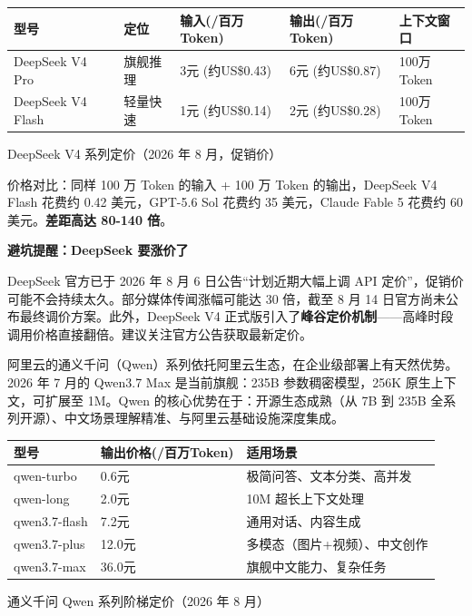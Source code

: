 \begin{center}
\begin{tabularx}{\linewidth}{|X|X|X|X|X|}
\hline
\textbf{型号} & \textbf{定位} & \textbf{输入(/百万Token)} & \textbf{输出(/百万Token)} & \textbf{上下文窗口} \tabularnewline
\hline
DeepSeek V4 Pro & 旗舰推理 & 3元 (约US\$0.43) & 6元 (约US\$0.87) & 100万Token \tabularnewline
DeepSeek V4 Flash & 轻量快速 & 1元 (约US\$0.14) & 2元 (约US\$0.28) & 100万Token \tabularnewline
\hline
\end{tabularx}
\end{center}

\begin{center}\small\color{gray}DeepSeek V4 系列定价（2026 年 8 月，促销价）\end{center}

价格对比：同样 100 万 Token 的输入 + 100 万 Token 的输出，DeepSeek V4 Flash 花费约 0.42 美元，GPT-5.6 Sol 花费约 35 美元，Claude Fable 5 花费约 60 美元。\textbf{差距高达 80-140 倍}。

\textbf{避坑提醒：DeepSeek 要涨价了}\par

DeepSeek 官方已于 2026 年 8 月 6 日公告“计划近期大幅上调 API 定价”，促销价可能不会持续太久。部分媒体传闻涨幅可能达 30 倍，截至 8 月 14 日官方尚未公布最终调价方案。此外，DeepSeek V4 正式版引入了\textbf{峰谷定价机制}——高峰时段调用价格直接翻倍。建议关注官方公告获取最新定价。


阿里云的通义千问（Qwen）系列依托阿里云生态，在企业级部署上有天然优势。2026 年 7 月的 Qwen3.7 Max 是当前旗舰：235B 参数稠密模型，256K 原生上下文，可扩展至 1M。Qwen 的核心优势在于：开源生态成熟（从 7B 到 235B 全系列开源）、中文场景理解精准、与阿里云基础设施深度集成。

\begin{center}
\begin{tabularx}{\linewidth}{|X|X|X|}
\hline
\textbf{型号} & \textbf{输出价格(/百万Token)} & \textbf{适用场景} \tabularnewline
\hline
qwen-turbo & 0.6元 & 极简问答、文本分类、高并发 \tabularnewline
qwen-long & 2.0元 & 10M 超长上下文处理 \tabularnewline
qwen3.7-flash & 7.2元 & 通用对话、内容生成 \tabularnewline
qwen3.7-plus & 12.0元 & 多模态（图片+视频）、中文创作 \tabularnewline
qwen3.7-max & 36.0元 & 旗舰中文能力、复杂任务 \tabularnewline
\hline
\end{tabularx}
\end{center}

\begin{center}\small\color{gray}通义千问 Qwen 系列阶梯定价（2026 年 8 月）\end{center}

